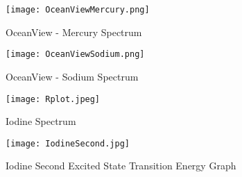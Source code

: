 \documentclass[12pt]{article}
\begin{document}
	\begin{figure}[htbp]
		\centering
		\caption{OceanView - Mercury Spectrum}
		\label{MercurySpectrum}
		\texttt{[image: OceanViewMercury.png]}
	\end{figure}
	
	\begin{figure}[htbp]
		\centering
		\caption{OceanView - Sodium Spectrum}
		\label{SodiumSpectrum}
		\texttt{[image: OceanViewSodium.png]}
	\end{figure}
	
	\begin{figure}[htbp]
		\centering
		\caption{Iodine Spectrum}
		\label{IodineSpectrum}
		\texttt{[image: Rplot.jpeg]}
	\end{figure}
	
	\begin{figure}[htbp]
		\centering
		\caption{Iodine Second Excited State Transition Energy Graph}
		\label{IodineSecond}
		\texttt{[image: IodineSecond.jpg]}
	\end{figure}
	
\clearpage
	
\end{document}
